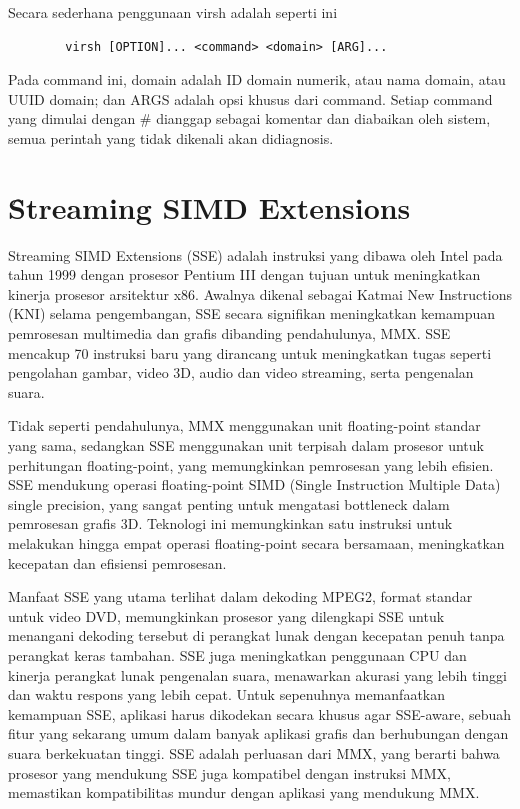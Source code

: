 Secara sederhana penggunaan virsh adalah seperti ini
\begin{center}
	\begin{verbatim}
		virsh [OPTION]... <command> <domain> [ARG]...
	\end{verbatim}
\end{center}

Pada command ini, domain adalah ID domain numerik, atau nama domain, atau UUID domain; dan ARGS adalah opsi khusus dari command. Setiap command yang dimulai dengan \# dianggap sebagai komentar dan diabaikan oleh sistem, semua perintah yang tidak dikenali akan didiagnosis.

\section{\f{Streaming SIMD Extensions}}
Streaming SIMD Extensions (SSE) adalah instruksi yang dibawa oleh Intel pada tahun 1999 dengan prosesor Pentium III dengan tujuan untuk meningkatkan kinerja prosesor arsitektur x86. Awalnya dikenal sebagai Katmai New Instructions (KNI) selama pengembangan, SSE secara signifikan meningkatkan kemampuan pemrosesan multimedia dan grafis dibanding pendahulunya, MMX. SSE mencakup 70 instruksi baru yang dirancang untuk meningkatkan tugas seperti pengolahan gambar, video 3D, audio dan video streaming, serta pengenalan suara\cite{informitStreamingSIMD}. 

Tidak seperti pendahulunya, MMX menggunakan unit floating-point standar yang sama, sedangkan SSE menggunakan unit terpisah dalam prosesor untuk perhitungan floating-point, yang memungkinkan pemrosesan yang lebih efisien. SSE mendukung operasi floating-point SIMD (Single Instruction Multiple Data) single precision, yang sangat penting untuk mengatasi bottleneck dalam pemrosesan grafis 3D. Teknologi ini memungkinkan satu instruksi untuk melakukan hingga empat operasi floating-point secara bersamaan, meningkatkan kecepatan dan efisiensi pemrosesan\cite{informitStreamingSIMD}. 

Manfaat SSE yang utama terlihat dalam dekoding MPEG2, format standar untuk video DVD, memungkinkan prosesor yang dilengkapi SSE untuk menangani dekoding tersebut di perangkat lunak dengan kecepatan penuh tanpa perangkat keras tambahan. SSE juga meningkatkan penggunaan CPU dan kinerja perangkat lunak pengenalan suara, menawarkan akurasi yang lebih tinggi dan waktu respons yang lebih cepat. Untuk sepenuhnya memanfaatkan kemampuan SSE, aplikasi harus dikodekan secara khusus agar SSE-aware, sebuah fitur yang sekarang umum dalam banyak aplikasi grafis dan berhubungan dengan suara berkekuatan tinggi. SSE adalah perluasan dari MMX, yang berarti bahwa prosesor yang mendukung SSE juga kompatibel dengan instruksi MMX, memastikan kompatibilitas mundur dengan aplikasi yang mendukung MMX\cite{informitStreamingSIMD}.

